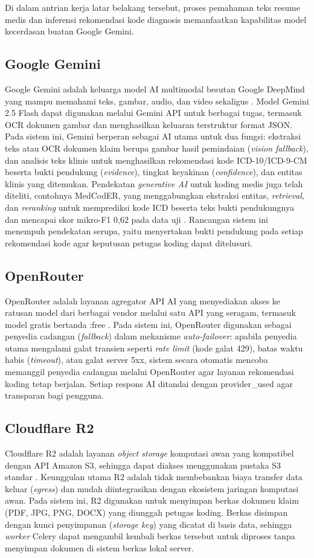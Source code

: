 Di dalam antrian kerja latar belakang tersebut, proses pemahaman teks resume medis dan inferensi rekomendasi kode diagnosis memanfaatkan kapabilitas model kecerdasan buatan Google Gemini.

\subsection{Google Gemini}
Google Gemini adalah keluarga model AI multimodal besutan Google DeepMind yang mampu memahami teks, gambar, audio, dan video sekaligus \cite{9}. Model Gemini 2.5 Flash dapat digunakan melalui Gemini API untuk berbagai tugas, termasuk OCR dokumen gambar dan menghasilkan keluaran terstruktur format JSON. Pada sistem ini, Gemini berperan sebagai AI utama untuk dua fungsi: ekstraksi teks atau OCR dokumen klaim berupa gambar hasil pemindaian (\textit{vision fallback}), dan analisis teks klinis untuk menghasilkan rekomendasi kode ICD-10/ICD-9-CM beserta bukti pendukung (\textit{evidence}), tingkat keyakinan (\textit{confidence}), dan entitas klinis yang ditemukan. Pendekatan \textit{generative AI} untuk koding medis juga telah diteliti, contohnya MedCodER, yang menggabungkan ekstraksi entitas, \textit{retrieval}, dan \textit{reranking} untuk memprediksi kode ICD beserta teks bukti pendukungnya dan mencapai skor mikro-F1 0,62 pada data uji \cite{2}. Rancangan sistem ini menempuh pendekatan serupa, yaitu menyertakan bukti pendukung pada setiap rekomendasi kode agar keputusan petugas koding dapat ditelusuri.

\subsection{OpenRouter}
OpenRouter adalah layanan agregator API AI yang menyediakan akses ke ratusan model dari berbagai vendor melalui satu API yang seragam, termasuk model gratis bertanda :free \cite{26}. Pada sistem ini, OpenRouter digunakan sebagai penyedia cadangan (\textit{fallback}) dalam mekanisme \textit{auto-failover}: apabila penyedia utama mengalami galat transien seperti \textit{rate limit} (kode galat 429), batas waktu habis (\textit{timeout}), atau galat server 5xx, sistem secara otomatis mencoba memanggil penyedia cadangan melalui OpenRouter agar layanan rekomendasi koding tetap berjalan. Setiap respons AI ditandai dengan provider\_used agar transparan bagi pengguna.

\subsection{Cloudflare R2}
Cloudflare R2 adalah layanan \textit{object storage} komputasi awan yang kompatibel dengan API Amazon S3, sehingga dapat diakses menggunakan pustaka S3 standar \cite{17}. Keunggulan utama R2 adalah tidak membebankan biaya transfer data keluar (\textit{egress}) dan mudah diintegrasikan dengan ekosistem jaringan komputasi awan. Pada sistem ini, R2 digunakan untuk menyimpan berkas dokumen klaim (PDF, JPG, PNG, DOCX) yang diunggah petugas koding. Berkas disimpan dengan kunci penyimpanan (\textit{storage key}) yang dicatat di basis data, sehingga \textit{worker} Celery dapat mengambil kembali berkas tersebut untuk diproses tanpa menyimpan dokumen di sistem berkas lokal server.

